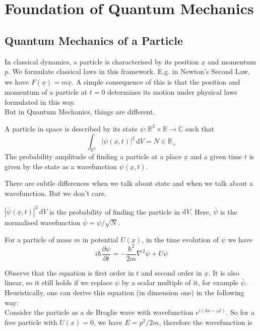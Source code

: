 \section{Foundation of Quantum Mechanics}
\subsection{Quantum Mechanics of a Particle}
In classical dynamics, a particle is characterised by its position $\underline{x}$ and momentum $\underline{p}$.
We formulate classical laws in this framework.
E.g. in Newton's Second Law, we have $F(\underline{x})=m\underline{\ddot{x}}$.
A simple consequence of this is that the position and momentum of a particle at $t=0$ determines its motion under physical laws formulated in this way.\\
But in Quantum Mechanics, things are different.
\begin{postulate}
    A particle in space is described by its state $\psi:\mathbb R^3\times\mathbb R\to\mathbb C$ such that
    $$\int_{\mathbb R^3}|\psi(\underline{x},t)|^2\,\mathrm dV=N\in\mathbb R_+$$
    The probability amplitude of finding a particle at a place $\underline{x}$ and a given time $t$ is given by the state as a wavefunction $\psi(\underline{x},t)$.
\end{postulate}
There are subtle differences when we talk about state and when we talk about a wavefunction.
But we don't care.
\begin{postulate}
    $|\bar\psi(\underline{x},t)|^2\,\mathrm dV$ is the probability of finding the particle in $\mathrm dV$.
    Here, $\bar\psi$ is the normalised wavefunction $\bar\psi=\psi/\sqrt{N}$.
\end{postulate}
\begin{postulate}
    For a particle of mass $m$ in potential $U(\underline{x})$, in the time evolution of $\psi$ we have
    $$i\hbar\frac{\partial\psi}{\partial t}=-\frac{\hbar^2}{2m}\nabla^2\psi+U\psi$$
\end{postulate}
Observe that the equation is first order in $t$ and second order in $\underline{x}$.
It is also linear, so it still holds if we replace $\psi$ by a scalar multiple of it, for example $\bar\psi$.
Heuristically, one can derive this equation (in dimension one) in the following way:\\
Consider the particle as a de Broglie wave with wavefunction $e^{i(kx-\omega t)}$.
So for a free particle with $U(x)=0$, we have $E=p^2/2m$, therefore the wavefunction is
